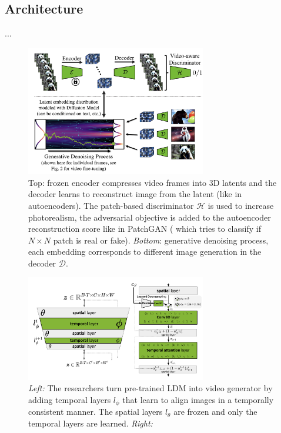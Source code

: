 \subsection{Architecture}

...

\begin{figure}
    \centering
    \includegraphics[width=0.7\textwidth]{images/video_ldm/enc_dec_denoise_process.png}
    \caption{Top: frozen encoder compresses video frames into 3D latents and the decoder learns to reconstruct image from the latent (like in autoencoders). The patch-based discriminator $\mathcal{H}$ is used to increase photorealism, the adversarial objective is added to the autoencoder reconstruction score like in PatchGAN (\cite{isola2017image} which tries to classify if $N \times N$ patch is real or fake). \textit{Bottom}: generative denoising process, each embedding corresponds to different image generation in the decoder $\mathcal{D}$.}
\end{figure}



\begin{figure}
    \centering
    \includegraphics[width=0.7\textwidth]{images/video_ldm/temporal_layers.png}
    \caption{\textit{Left:} The researchers turn pre-trained LDM into video generator by adding temporal layers $l_\phi$ that learn to align images in a temporally consistent manner. The spatial layers $l_\theta$ are frozen and only the temporal layers are learned. \textit{Right:} }
\end{figure}


